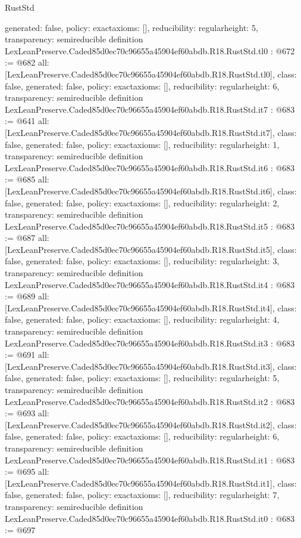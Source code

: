 \begin{lexlean}{RustStd}
\begin{coremodule}
{  generated: false,
  policy: exact{axioms: []},
  reducibility: regular{height: 5},
  transparency: semireducible
}
definition LexLeanPreserve.Caded85d0ec70c96655a45904ef60abdb.R18.RustStd.tl0 : @672 := @682 {
  all: [LexLeanPreserve.Caded85d0ec70c96655a45904ef60abdb.R18.RustStd.tl0],
  class: false,
  generated: false,
  policy: exact{axioms: []},
  reducibility: regular{height: 6},
  transparency: semireducible
}
definition LexLeanPreserve.Caded85d0ec70c96655a45904ef60abdb.R18.RustStd.it7 : @683 := @641 {
  all: [LexLeanPreserve.Caded85d0ec70c96655a45904ef60abdb.R18.RustStd.it7],
  class: false,
  generated: false,
  policy: exact{axioms: []},
  reducibility: regular{height: 1},
  transparency: semireducible
}
definition LexLeanPreserve.Caded85d0ec70c96655a45904ef60abdb.R18.RustStd.it6 : @683 := @685 {
  all: [LexLeanPreserve.Caded85d0ec70c96655a45904ef60abdb.R18.RustStd.it6],
  class: false,
  generated: false,
  policy: exact{axioms: []},
  reducibility: regular{height: 2},
  transparency: semireducible
}
definition LexLeanPreserve.Caded85d0ec70c96655a45904ef60abdb.R18.RustStd.it5 : @683 := @687 {
  all: [LexLeanPreserve.Caded85d0ec70c96655a45904ef60abdb.R18.RustStd.it5],
  class: false,
  generated: false,
  policy: exact{axioms: []},
  reducibility: regular{height: 3},
  transparency: semireducible
}
definition LexLeanPreserve.Caded85d0ec70c96655a45904ef60abdb.R18.RustStd.it4 : @683 := @689 {
  all: [LexLeanPreserve.Caded85d0ec70c96655a45904ef60abdb.R18.RustStd.it4],
  class: false,
  generated: false,
  policy: exact{axioms: []},
  reducibility: regular{height: 4},
  transparency: semireducible
}
definition LexLeanPreserve.Caded85d0ec70c96655a45904ef60abdb.R18.RustStd.it3 : @683 := @691 {
  all: [LexLeanPreserve.Caded85d0ec70c96655a45904ef60abdb.R18.RustStd.it3],
  class: false,
  generated: false,
  policy: exact{axioms: []},
  reducibility: regular{height: 5},
  transparency: semireducible
}
definition LexLeanPreserve.Caded85d0ec70c96655a45904ef60abdb.R18.RustStd.it2 : @683 := @693 {
  all: [LexLeanPreserve.Caded85d0ec70c96655a45904ef60abdb.R18.RustStd.it2],
  class: false,
  generated: false,
  policy: exact{axioms: []},
  reducibility: regular{height: 6},
  transparency: semireducible
}
definition LexLeanPreserve.Caded85d0ec70c96655a45904ef60abdb.R18.RustStd.it1 : @683 := @695 {
  all: [LexLeanPreserve.Caded85d0ec70c96655a45904ef60abdb.R18.RustStd.it1],
  class: false,
  generated: false,
  policy: exact{axioms: []},
  reducibility: regular{height: 7},
  transparency: semireducible
}
definition LexLeanPreserve.Caded85d0ec70c96655a45904ef60abdb.R18.RustStd.it0 : @683 := @697 {
}
\end{coremodule}
\end{lexlean}
